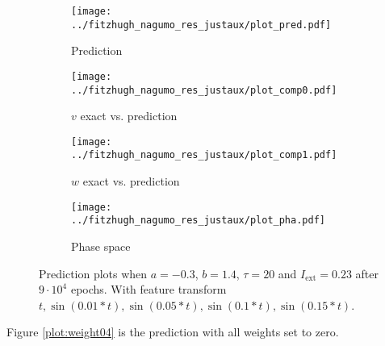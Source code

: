 \documentclass[a4paper]{article}
\begin{document}
\begin{figure}[H]
	\centering 
	\begin{subfigure}[b]{0.47\textwidth}
		\centering
		\texttt{[image: ../fitzhugh\_nagumo\_res\_justaux/plot\_pred.pdf]}
		\caption{Prediction}
		\label{fig:weight03a}
	\end{subfigure}
	\begin{subfigure}[b]{0.47\textwidth}
		\centering
		\texttt{[image: ../fitzhugh\_nagumo\_res\_justaux/plot\_comp0.pdf]}
		\caption{$v$ exact vs. prediction}
		\label{fig:weight03b}
	\end{subfigure}
	\begin{subfigure}[b]{0.47\textwidth}
		\centering
		\texttt{[image: ../fitzhugh\_nagumo\_res\_justaux/plot\_comp1.pdf]}
		\caption{$w$ exact vs. prediction}
		\label{fig:weight03c}
	\end{subfigure}
	\begin{subfigure}[b]{0.47\textwidth}
		\centering
		\texttt{[image: ../fitzhugh\_nagumo\_res\_justaux/plot\_pha.pdf]}
		\caption{Phase space}
		\label{fig:weight03d}
	\end{subfigure}
	\caption{Prediction plots when $a=-0.3$, $b=1.4$, $\tau=20$ and $ I_{\text{ext}}=0.23$ after $9\cdot10^4$ epochs. With feature transform $t, \sin(0.01 * t), \sin(0.05 * t), \sin(0.1 * t), \sin(0.15 * t)$.}
	\label{plot:weight03}
\end{figure} 	

Figure \ref{plot:weight04} is the prediction with all weights set to zero.
\end{document}
